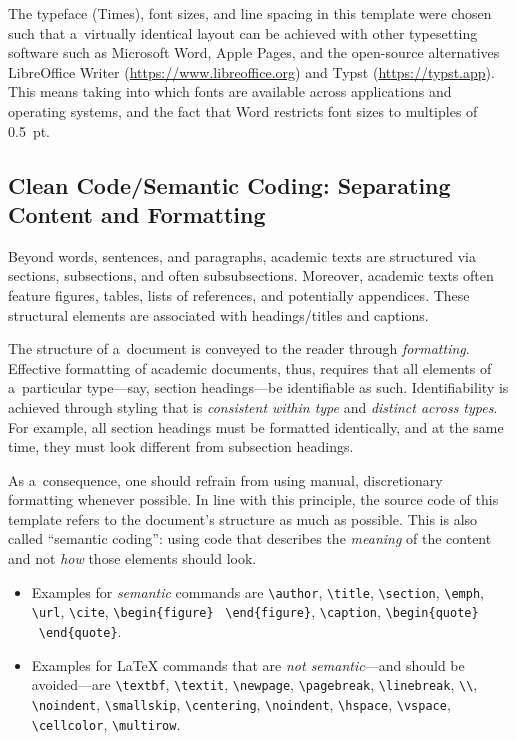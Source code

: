\documentclass[11pt, a4paper, oneside]{article}
\newlength{\baselinedist}
\newlength{\smalllinespacing}
\renewenvironment{quote}{%
	\par\list{}{%
		\baselineskip = \smalllinespacing%
		\leftmargin = \baselineskip%
		\rightmargin = \leftmargin%
		\topsep = 0.5\baselinedist plus 3ex
	}
	\item\relax%
}{%
	\endlist%
}
\theoremstyle{Plain}
\theoremstyle{Definition}
\theoremstyle{Remark}
\let \cite \textcite
\begin{document}
The typeface (Times), font sizes, and line spacing in this template were chosen such that a~virtually identical layout can be achieved with other typesetting software such as Microsoft Word, Apple Pages, and the open-source alternatives Libre\-Office Writer (\url{https://www.libreoffice.org}) and Typst (\url{https://typst.app}). This means taking into which fonts are available across applications and operating systems, and the fact that Word restricts font sizes to multiples of 0.5~pt.

\subsection{Clean Code/Semantic Coding: Separating Content and Formatting}

Beyond words, sentences, and paragraphs, academic texts are structured via sections, subsections, and often subsubsections. Moreover, academic texts often feature figures, tables, lists of references, and potentially appendices. These structural elements are associated with headings\slash titles and captions.

The structure of a~document is conveyed to the reader through \emph{formatting}. Effective formatting of academic documents, thus, requires that all elements of a~particular type---say, section headings---be identifiable as such. Identifiability is achieved through styling that is \emph{consistent within type} and \emph{distinct across types}. For example, all section headings must be formatted identically, and at the same time, they must look different from subsection headings.

As a~consequence, one should refrain from using manual, discretionary formatting whenever possible. In line with this principle, the source code of this template refers to the document's structure as much as possible. This is also called ``semantic coding'': using code that describes the \emph{meaning} of the content and not \emph{how} those elements should look.
\begin{itemize}
	\item Examples for \emph{semantic} commands are \verb|\author|, \verb|\title|, \verb|\section|,  \verb|\emph|, \verb|\url|, \verb|\cite|, \verb|\begin{figure}| \textellipsis\ \verb|\end{figure}|, \verb|\caption|, \verb|\begin{quote}| \textellipsis\ \verb|\end{quote}|.
	\item Examples for LaTeX commands that are \emph{not semantic}---and should be avoided---are \verb|\textbf|, \verb|\textit|, \verb|\newpage|, \verb|\pagebreak|, \verb|\linebreak|, \verb|\\|, \verb|\noindent|, \verb|\smallskip|, \verb|\centering|, \verb|\noindent|, \verb|\hspace|, \verb|\vspace|, \verb|\cellcolor|, \verb|\multirow|.
\end{itemize}
\end{document}
